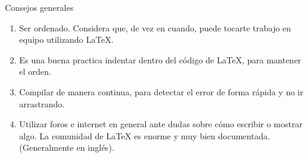 \documentclass[../slides.tex]{subfiles}
\begin{document}
    \begin{frame}{Consejos generales}
    	\begin{enumerate}   
    		\item Ser ordenado. Considera que, de vez en cuando, puede tocarte trabajo en equipo utilizando \LaTeX{}.
            \item Es una buena practica indentar dentro del código de \LaTeX{}, para mantener el orden.
            \item Compilar de manera continua, para detectar el error de forma rápida y no ir arrastrando.
            \item Utilizar foros e internet en general ante dudas sobre cómo escribir o mostrar algo. La comunidad de \LaTeX{} es enorme y muy bien documentada. (Generalmente en inglés).
    	\end{enumerate}

    \end{frame}
\end{document}
